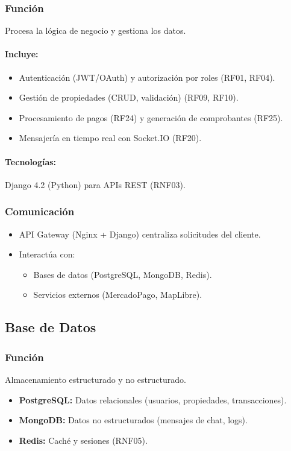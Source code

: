		\subsubsection*{Función}
			Procesa la lógica de negocio y gestiona los datos.
			
			\paragraph{Incluye:}
			\begin{itemize}
				\item Autenticación (JWT/OAuth) y autorización por roles (RF01, RF04).
				\item Gestión de propiedades (CRUD, validación) (RF09, RF10).
				\item Procesamiento de pagos (RF24) y generación de comprobantes (RF25).
				\item Mensajería en tiempo real con Socket.IO (RF20).
			\end{itemize}
			
			\paragraph{Tecnologías:} Django 4.2 (Python) para APIs REST (RNF03).
			
		\subsubsection*{Comunicación}
			\begin{itemize}
				\item API Gateway (Nginx + Django) centraliza solicitudes del cliente.
				\item Interactúa con:
				\begin{itemize}
					\item Bases de datos (PostgreSQL, MongoDB, Redis).
					\item Servicios externos (MercadoPago, MapLibre).
				\end{itemize}
			\end{itemize}
	
	\subsection{Base de Datos}
		\subsubsection*{Función}
			Almacenamiento estructurado y no estructurado.
			\begin{itemize}
				\item \textbf{PostgreSQL:} Datos relacionales (usuarios, propiedades, transacciones).
				\item \textbf{MongoDB:} Datos no estructurados (mensajes de chat, logs).
				\item \textbf{Redis:} Caché y sesiones (RNF05).
			\end{itemize}
	
